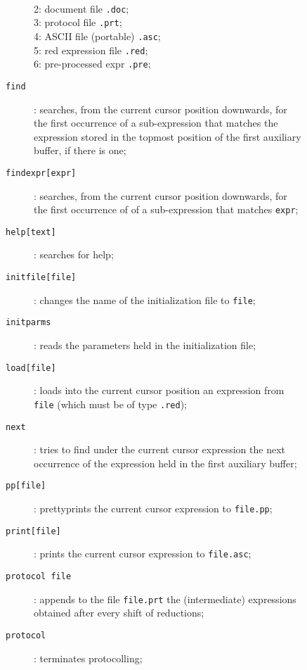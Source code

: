\begin{description}
\begin{description}
\begin{description}
\\2: document file       {\tt .doc};
\\3: protocol file       {\tt .prt};
\\4: ASCII file (portable) {\tt .asc};
\\5: red expression file {\tt .red};
\\6: pre-processed expr  {\tt .pre};          
\\
\item[{\tt find}]: searches, from the current cursor position downwards, for the first
occurrence of a sub-expression that matches the expression stored in the topmost position
of the first auxiliary buffer, if there is one;
\item[{\tt findexpr[expr]}]: searches, from the current cursor position downwards, 
for the first occurrence of of a sub-expression that matches {\tt expr};
\item[{\tt help[text]}]: searches for help;
\item[{\tt initfile[file]}]: changes the name of the initialization 
file to {\tt file};
\item[{\tt initparms}]: reads the parameters held in the initialization file;
\item[{\tt load[file]}]: loads into the current cursor position an 
expression from {\tt file} (which must be of type {\tt .red});
\item[{\tt next}]: tries to find under the current cursor expression 
the next occurrence of the expression
held in the first auxiliary buffer;
\item[{\tt pp[file]}]: prettyprints the current cursor expression
to {\tt file.pp};
\item[{\tt print[file]}]: prints the current cursor expression to
{\tt file.asc};
\item[{\tt protocol file}]: appends to the file {\tt file.prt}
the (intermediate) expressions obtained after every shift of reductions;
\item[{\tt protocol}]: terminates protocolling;


\end{description}
\end{description}
\end{description}
